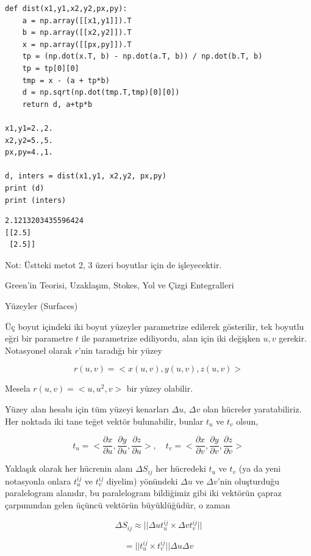 \documentclass[12pt,fleqn]{article}\usepackage{../../common}
\begin{document}
\begin{verbatim}
def dist(x1,y1,x2,y2,px,py):
    a = np.array([[x1,y1]]).T
    b = np.array([[x2,y2]]).T
    x = np.array([[px,py]]).T
    tp = (np.dot(x.T, b) - np.dot(a.T, b)) / np.dot(b.T, b)
    tp = tp[0][0]
    tmp = x - (a + tp*b)
    d = np.sqrt(np.dot(tmp.T,tmp)[0][0])
    return d, a+tp*b

x1,y1=2.,2.
x2,y2=5.,5.
px,py=4.,1.

d, inters = dist(x1,y1, x2,y2, px,py)
print (d)
print (inters)
\end{verbatim}

\begin{verbatim}
2.1213203435596424
[[2.5]
 [2.5]]
\end{verbatim}

Not: Üstteki metot 2, 3 üzeri boyutlar için de işleyecektir. 

Green'in Teorisi, Uzaklaşım, Stokes, Yol ve Çizgi Entegralleri

Yüzeyler (Surfaces)

Üç boyut içindeki iki boyut yüzeyler parametrize edilerek gösterilir,
tek boyutlu eğri bir parametre $t$ ile parametrize ediliyordu, alan için
iki değişken $u,v$ gerekir. Notasyonel olarak $r$'nin taradığı bir yüzey

$$
r(u,v) = < x(u,v), y(u,v), z(u,v) >
$$

Mesela $r(u,v) = < u, u^2, v >$ bir yüzey olabilir.

Yüzey alan hesabı için tüm yüzeyi kenarları $\Delta u$, $\Delta v$ olan hücreler
yaratabiliriz. Her noktada iki tane teğet vektör bulunabilir, bunlar $t_u$ ve
$t_v$ olsun,

$$
t_u = < \frac{\partial x}{\partial u},
        \frac{\partial y}{\partial u},
        \frac{\partial z}{\partial u} >, \quad
t_v = < \frac{\partial x}{\partial v},
        \frac{\partial y}{\partial v},
        \frac{\partial z}{\partial v} >        
$$

Yaklaşık olarak her hücrenin alanı $\Delta S_{ij}$ her hücredeki $t_u$ ve $t_v$
(ya da yeni notasyonla onlara $t_u^{ij}$ ve $t_v^{ij}$ diyelim) yönündeki
$\Delta u$ ve $\Delta v$'nin oluşturduğu paralelogram alanıdır, bu paralelogram
bildiğimiz gibi iki vektörün çapraz çarpımından gelen üçüncü vektörün
büyüklüğüdür, o zaman 

$$
\Delta S_{ij} \approx || \Delta u t_u^{ij} \times \Delta v t_v^{ij} ||
$$

$$
= ||  t_u^{ij} \times t_v^{ij} || \Delta u \Delta v
$$
        
\end{document}
